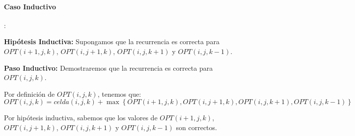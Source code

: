 \paragraph{Caso Inductivo}: 

\textbf{Hipótesis Inductiva:} Supongamos que la recurrencia es correcta para $OPT(i+1, j, k)$, $OPT(i, j+1, k)$, $OPT(i, j, k+1)$ y $OPT(i, j, k-1)$.

\textbf{Paso Inductivo:} Demostraremos que la recurrencia es correcta para $OPT(i, j, k)$.

Por definición de $OPT(i, j, k)$, tenemos que:
\[
OPT(i, j, k) = celda(i, j, k) + \max\left\{OPT(i+1, j, k), OPT(i, j+1, k), OPT(i, j, k+1), OPT(i, j, k-1)\right\}
\]

Por hipótesis inductiva, sabemos que los valores de $OPT(i+1, j, k)$, $OPT(i, j+1, k)$, $OPT(i, j, k+1)$ y $OPT(i, j, k-1)$ son correctos.

